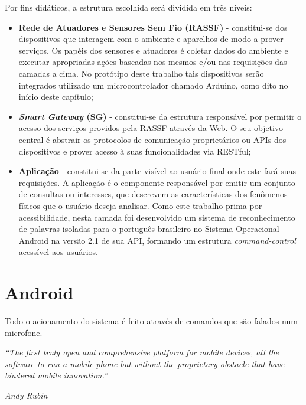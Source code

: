 \documentclass[12pt,a4paper,oneside]{report}
\begin{document}
Por fins didáticos, a estrutura escolhida será dividida em três níveis:
\begin{itemize}
    \item \textbf{Rede de Atuadores e Sensores Sem Fio (RASSF)} - constitui-se dos dispositivos que interagem com o ambiente e aparelhos de modo a prover serviços. Os papéis dos sensores e atuadores é coletar dados do ambiente e executar apropriadas ações baseadas nos mesmos e/ou nas requisições das camadas a cima. No protótipo deste trabalho tais dispositivos serão integrados utilizado um microcontrolador chamado Arduino, como dito no início deste capítulo;
    \item \textbf{\emph{Smart Gateway} (SG)} - constitui-se da estrutura responsável por permitir o acesso dos serviços providos pela RASSF através da Web. O seu objetivo central é abstrair os protocolos de comunicação proprietários ou APIs dos dispositivos e prover acesso à suas funcionalidades via RESTful;
    \item \textbf{Aplicação} - constitui-se da parte visível ao usuário final onde este fará suas requisições. A aplicação é o componente responsável por emitir um conjunto de consultas ou interesses, que descrevem as características dos fenômenos físicos que o usuário deseja analisar. Como este trabalho prima por acessibilidade, nesta camada foi desenvolvido um sistema de reconhecimento de palavras isoladas para o português brasileiro no Sistema Operacional Android na versão 2.1 de sua API, formando um estrutura \emph{command-control} acessível aos usuários.
\end{itemize}

%
%
\section{Android} Todo o acionamento do sistema é feito através de comandos que são falados num microfone.

\begin{center}
\begin{minipage}{.8\textwidth}
\emph{``The first truly open and comprehensive platform for mobile devices, all the software to run a mobile phone but without the proprietary obstacle that have bindered mobile innovation.''}
\begin{flushright}
    \begin{minipage}{.3\textwidth}
	\emph{Andy Rubin}\cite{Andy Rubin}
    \end{minipage}
\end{flushright}

\end{minipage}
\end{center}
\end{document}
